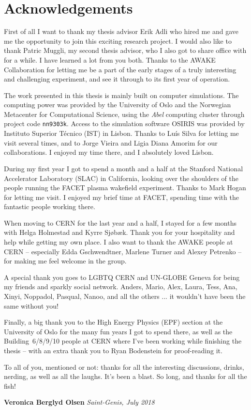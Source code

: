 \chapter*{Acknowledgements}

First of all I want to thank my thesis advisor Erik Adli who hired me and gave me the opportunity to join this exciting research project.
I would also like to thank Patric Muggli, my second thesis advisor, who I also got to share office with for a while.
I have learned a lot from you both.
Thanks to the AWAKE Collaboration for letting me be a part of the early stages of a truly interesting and challenging experiment, and see it through to its first year of operation.

The work presented in this thesis is mainly built on computer simulations.
The computing power was provided by the University of Oslo and the Norwegian Metacenter for Computational Science, using the \textit{Abel} computing cluster through project code \texttt{nn9303k}.
Access to the simulation software OSIRIS was provided by Instituto Superior Técnico (IST) in Lisbon.
Thanks to Luís Silva for letting me visit several times, and to Jorge Vieira and Ligia Diana Amorim for our collaborations.
I enjoyed my time there, and I absolutely loved Lisbon.

During my first year I got to spend a month and a half at the Stanford National Accelerator Laboratory (SLAC) in California, looking over the shoulders of the people running the FACET plasma wakefield experiment.
Thanks to Mark Hogan for letting me visit.
I enjoyed my brief time at FACET, spending time with the fantastic people working there.

When moving to CERN for the last year and a half, I stayed for a few months with Helga Holmestad and Kyrre Sjøbæk.
Thank you for your hospitality and help while getting my own place.
I also want to thank the AWAKE people at CERN -- especially Edda Gschwendtner, Marlene Turner and Alexey Petrenko -- for making me feel welcome in the group.

A special thank you goes to LGBTQ CERN and UN-GLOBE Geneva for being my friends and sparkly social network.
Anders, Mario, Alex, Laura, Tess, Ana, Xinyi, Noppadol, Pasqual, Nanoo, and all the others ... it wouldn't have been the same without you!

Finally, a big thank you to the High Energy Physics (EPF) section at the University of Oslo for the many fun years I got to spend there, as well as the Building~6/8/9/10 people at CERN where I've been working while finishing the thesis -- with an extra thank you to Ryan Bodenstein for proof-reading it.

To all of you, mentioned or not: thanks for all the interesting discussions, drinks, nerding, as well as all the laughs.
It's been a blast.
So long, and thanks for all the fish!

\vfill
\null\hfill\textbf{Veronica Berglyd Olsen}
\newline
\null\hfill\textit{Saint-Genis, July 2018}
